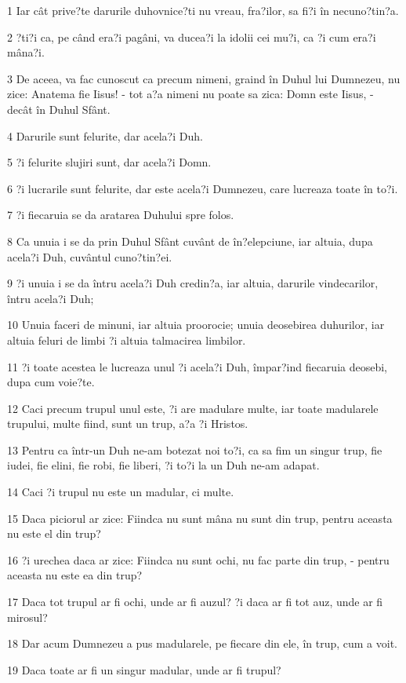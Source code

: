 \par 1 Iar cât prive?te darurile duhovnice?ti nu vreau, fra?ilor, sa fi?i în necuno?tin?a.
\par 2 ?ti?i ca, pe când era?i pagâni, va ducea?i la idolii cei mu?i, ca ?i cum era?i mâna?i.
\par 3 De aceea, va fac cunoscut ca precum nimeni, graind în Duhul lui Dumnezeu, nu zice: Anatema fie Iisus! - tot a?a nimeni nu poate sa zica: Domn este Iisus, - decât în Duhul Sfânt.
\par 4 Darurile sunt felurite, dar acela?i Duh.
\par 5 ?i felurite slujiri sunt, dar acela?i Domn.
\par 6 ?i lucrarile sunt felurite, dar este acela?i Dumnezeu, care lucreaza toate în to?i.
\par 7 ?i fiecaruia se da aratarea Duhului spre folos.
\par 8 Ca unuia i se da prin Duhul Sfânt cuvânt de în?elepciune, iar altuia, dupa acela?i Duh, cuvântul cuno?tin?ei.
\par 9 ?i unuia i se da întru acela?i Duh credin?a, iar altuia, darurile vindecarilor, întru acela?i Duh;
\par 10 Unuia faceri de minuni, iar altuia proorocie; unuia deosebirea duhurilor, iar altuia feluri de limbi ?i altuia talmacirea limbilor.
\par 11 ?i toate acestea le lucreaza unul ?i acela?i Duh, împar?ind fiecaruia deosebi, dupa cum voie?te.
\par 12 Caci precum trupul unul este, ?i are madulare multe, iar toate madularele trupului, multe fiind, sunt un trup, a?a ?i Hristos.
\par 13 Pentru ca într-un Duh ne-am botezat noi to?i, ca sa fim un singur trup, fie iudei, fie elini, fie robi, fie liberi, ?i to?i la un Duh ne-am adapat.
\par 14 Caci ?i trupul nu este un madular, ci multe.
\par 15 Daca piciorul ar zice: Fiindca nu sunt mâna nu sunt din trup, pentru aceasta nu este el din trup?
\par 16 ?i urechea daca ar zice: Fiindca nu sunt ochi, nu fac parte din trup, - pentru aceasta nu este ea din trup?
\par 17 Daca tot trupul ar fi ochi, unde ar fi auzul? ?i daca ar fi tot auz, unde ar fi mirosul?
\par 18 Dar acum Dumnezeu a pus madularele, pe fiecare din ele, în trup, cum a voit.
\par 19 Daca toate ar fi un singur madular, unde ar fi trupul?
